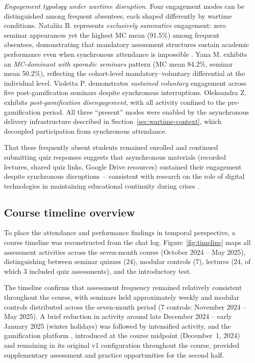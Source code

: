 \textit{Engagement typology under wartime disruption.} Four engagement modes can be distinguished among frequent absentees, each shaped differently by wartime conditions. Nataliia B. represents \emph{exclusively summative} engagement: zero seminar appearances yet the highest MC mean (91.5\%) among frequent absentees, demonstrating that mandatory assessment structures sustain academic performance even when synchronous attendance is impossible \cite{Hattie2009}. Yana M. exhibits an \emph{MC-dominant with sporadic seminars} pattern (MC mean 84.2\%, seminar mean 50.2\%), reflecting the cohort-level mandatory--voluntary differential at the individual level. Violetta P. demonstrates \emph{sustained voluntary} engagement across five post-gamification seminars despite synchronous interruptions. Oleksandra Z. exhibits \emph{post-gamification disengagement}, with all activity confined to the pre-gamification period. All three ``present'' modes were enabled by the asynchronous delivery infrastructure described in Section~\ref{sec:wartime-context}, which decoupled participation from synchronous attendance.

That these frequently absent students remained enrolled and continued submitting quiz responses suggests that asynchronous materials (recorded lectures, shared quiz links, Google Drive resources) sustained their engagement despite synchronous disruptions~-- consistent with research on the role of digital technologies in maintaining educational continuity during crises \cite{UNESCO2023, Striuk_2022}.

\subsection{Course timeline overview}

To place the attendance and performance findings in temporal perspective, a course timeline was reconstructed from the chat log. Figure~\ref{fig:timeline} maps all assessment activities across the seven-month course (October 2024 -- May 2025), distinguishing between seminar quizzes (24), modular controls (7), lectures (24, of which 3 included quiz assessments), and the introductory test.

The timeline confirms that assessment frequency remained relatively consistent throughout the course, with seminars held approximately weekly and modular controls distributed across the seven-month period (7 controls: November 2024 -- May 2025). A brief reduction in activity around late December 2024 -- early January 2025 (winter holidays) was followed by intensified activity, and the gamification platform \cite{KorniienkoSemerikov2024, Titova2025cte}, introduced at the course midpoint (December~1, 2024) and remaining in its original v1 configuration throughout the course, provided supplementary assessment and practice opportunities for the second half.

